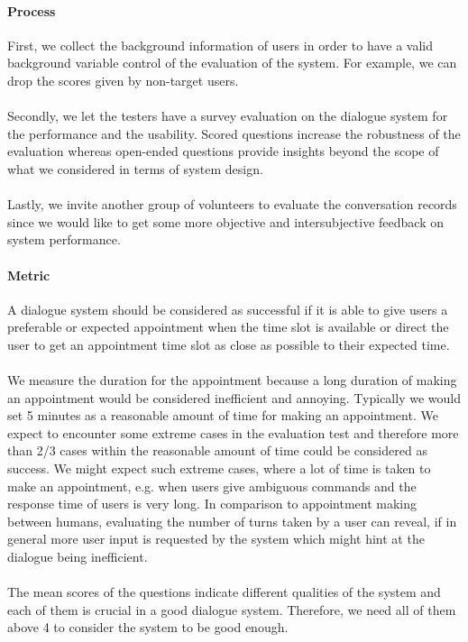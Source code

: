 \documentclass{article}
\begin{document}
\paragraph{Process}
First, we collect the background information of users in order to have a valid background variable control of the evaluation of the system. For example, we can drop the scores given by non-target users.\\
\\
Secondly, we let the testers have a survey evaluation on the dialogue system for the performance and the usability. %
Scored questions increase the robustness of the evaluation whereas open-ended questions provide insights beyond the scope of what we considered in terms of system design.\\
\\
Lastly, we invite another group of volunteers to evaluate the conversation records since  we would like to get some more objective and intersubjective feedback on system performance.

\paragraph{Metric}
A dialogue system should be considered as successful if it is able to give users a preferable or expected appointment when the time slot is available or direct the user to get an appointment time slot as close as possible to their expected time. \\
\\
We measure the duration for the appointment because a long duration of making an appointment would be considered inefficient and annoying. Typically we would set 5 minutes as a reasonable amount of time for making an appointment. We expect to encounter some extreme cases in the evaluation test and therefore more than 2/3 cases within the reasonable amount of time could be considered as success. We might expect such extreme cases, where a lot of time is taken to make an appointment, e.g. when users give ambiguous commands and the response time of users is very long. In comparison to appointment making between humans,  evaluating the number of turns taken by a user can reveal, if in general more user input is requested by the system which might hint at the dialogue being inefficient.\\
\\
The mean scores of the questions indicate different qualities of the system and each of them is crucial in a good dialogue system. Therefore, we need all of them above 4 to consider the system to be good enough.
\end{document}
